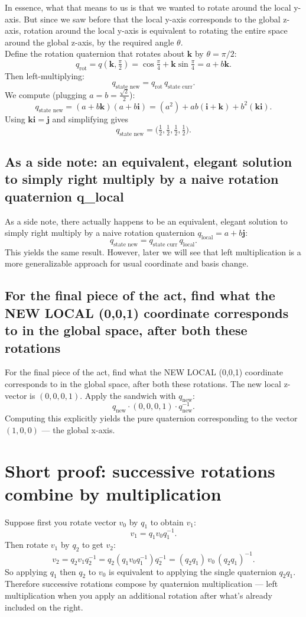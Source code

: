 \documentclass[11pt]{article}
\begin{document}
In essence, what that means to us is that we wanted to rotate around the local y-axis. But since we saw before that the local y-axis corresponds to the global z-axis, rotation around the local y-axis is equivalent to rotating the entire space around the global z-axis, by the required angle \(\theta\).
\\
Define the rotation quaternion that rotates about \(\mathbf{k}\) by \(\theta=\pi/2\):
\[
q_{\text{rot}} = q(\mathbf{k},\tfrac{\pi}{2})
= \cos\tfrac{\pi}{4} + \mathbf{k}\sin\tfrac{\pi}{4}
= a + b\mathbf{k}.
\]
Then left-multiplying:
\[
q_{\text{state new}} = q_{\text{rot}} \, q_{\text{state curr}}.
\]
We compute (plugging \(a=b=\tfrac{\sqrt{2}}{2}\)):
\[
q_{\text{state new}} = (a + b\mathbf{k})(a + b\mathbf{i})
= (a^2)\!+\!ab(\mathbf{i} + \mathbf{k}) + b^2(\mathbf{k}\mathbf{i}).
\]
Using \(\mathbf{k}\mathbf{i}=\mathbf{j}\) and simplifying gives
\[
q_{\text{state new}} = \Big(\tfrac{1}{2},\tfrac{1}{2},\tfrac{1}{2},\tfrac{1}{2}\Big).
\]

\subsection{As a side note: an equivalent, elegant solution to simply right multiply by a naive rotation quaternion q_local}
As a side note, there actually happens to be an equivalent, elegant solution to simply right multiply by a naive rotation quaternion \(q_\text{local} = a + b\mathbf{j}\):
\[
q_{\text{state new}} = q_{\text{state curr}} \, q_\text{local}.
\]
This yields the same result. However, later we will see that left multiplication is a more generalizable approach for usual coordinate and basis change.

\subsection{For the final piece of the act, find what the NEW LOCAL (0,0,1) coordinate corresponds to in the global space, after both these rotations}
For the final piece of the act, find what the NEW LOCAL (0,0,1) coordinate corresponds to in the global space, after both these rotations. The new local z-vector is \((0,0,0,1)\). Apply the sandwich with \(q_{\text{new}}\):
\[
q_{\text{new}} \cdot (0,0,0,1) \cdot q_{\text{new}}^{-1}.
\]
Computing this explicitly yields the pure quaternion corresponding to the vector \((1,0,0)\) — the global x-axis.

\section{Short proof: successive rotations combine by multiplication}
Suppose first you rotate vector \(v_0\) by \(q_1\) to obtain \(v_1\):
\[
v_1 = q_1 v_0 q_1^{-1}.
\]
Then rotate \(v_1\) by \(q_2\) to get \(v_2\):
\[
v_2 = q_2 v_1 q_2^{-1} = q_2 (q_1 v_0 q_1^{-1}) q_2^{-1}
    = (q_2 q_1)\, v_0 \, (q_2 q_1)^{-1}.
\]
So applying \(q_1\) then \(q_2\) to \(v_0\) is equivalent to applying the single
quaternion \(q_2 q_1\). Therefore successive rotations compose by quaternion
multiplication — left multiplication when you apply an additional rotation after
what's already included on the right.
\end{document}
